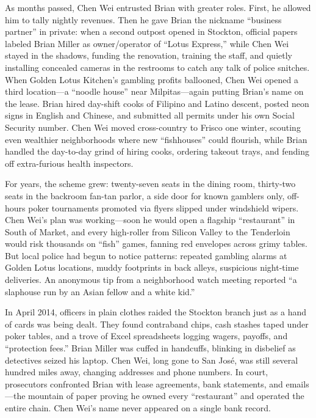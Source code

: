 As months passed, Chen Wei entrusted Brian with greater roles. First, he allowed him to tally nightly 
revenues. Then he gave Brian the nickname “business partner” in private: when a second outpost opened in 
Stockton, official papers labeled Brian Miller as owner/operator of “Lotus Express,” while Chen Wei stayed 
in the shadows, funding the renovation, training the staff, and quietly installing concealed cameras in 
the restrooms to catch any talk of police snitches. When Golden Lotus Kitchen’s gambling profits ballooned, 
Chen Wei opened a third location—a “noodle house” near Milpitas—again putting Brian’s name on the lease. 
Brian hired day-shift cooks of Filipino and Latino descent, posted neon signs in English and Chinese, and 
submitted all permits under his own Social Security number. Chen Wei moved cross-country to Frisco one 
winter, scouting even wealthier neighborhoods where new “fishhouses” could flourish, while Brian handled 
the day-to-day grind of hiring cooks, ordering takeout trays, and fending off extra-furious health inspectors.

For years, the scheme grew: twenty-seven seats in the dining room, thirty-two seats in the backroom fan-tan 
parlor, a side door for known gamblers only, off-hours poker tournaments promoted via flyers slipped under 
windshield wipers. Chen Wei’s plan was working—soon he would open a flagship “restaurant” in South of Market, 
and every high-roller from Silicon Valley to the Tenderloin would risk thousands on “fish” games, fanning 
red envelopes across grimy tables. But local police had begun to notice patterns: repeated gambling alarms 
at Golden Lotus locations, muddy footprints in back alleys, suspicious night-time deliveries. An anonymous 
tip from a neighborhood watch meeting reported “a slaphouse run by an Asian fellow and a white kid.”

In April 2014, officers in plain clothes raided the Stockton branch just as a hand of cards was being dealt. 
They found contraband chips, cash stashes taped under poker tables, and a trove of Excel spreadsheets logging 
wagers, payoffs, and “protection fees.” Brian Miller was cuffed in handcuffs, blinking in disbelief as 
detectives seized his laptop. Chen Wei, long gone to San José, was still several hundred miles away, changing 
addresses and phone numbers. In court, prosecutors confronted Brian with lease agreements, bank statements, 
and emails—the mountain of paper proving he owned every “restaurant” and operated the entire chain. Chen Wei’s 
name never appeared on a single bank record.

